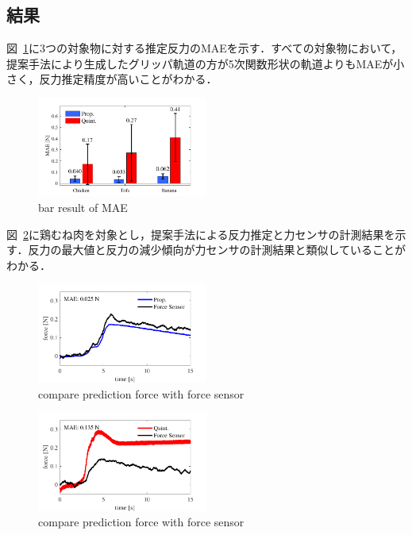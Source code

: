 \documentclass[a4paper]{jarticle}
\begin{document}
\subsection{結果}
図~\ref{fig:bar_result}に3つの対象物に対する推定反力のMAEを示す．すべての対象物において，提案手法により生成したグリッパ軌道の方が5次関数形状の軌道よりもMAEが小さく，反力推定精度が高いことがわかる．
\begin{figure}[htbp]
    \centering
    \includegraphics[width=0.5\textwidth]{bar_result.pdf}
    \caption{bar result of MAE}  
    \label{fig:bar_result}
\end{figure}
図~\ref{fig:pre_prop}に鶏むね肉を対象とし，提案手法による反力推定と力センサの計測結果を示す．反力の最大値と反力の減少傾向が力センサの計測結果と類似していることがわかる．
\begin{figure}[htbp]
    \centering
    \includegraphics[width=0.5\textwidth]{pre_prop.pdf}
    \caption{compare prediction force with force sensor}
    \label{fig:pre_prop}
\end{figure}
\begin{figure}[htbp]
    \centering
    \includegraphics[width=0.5\textwidth]{pre_quint.pdf}
    \caption{compare prediction force with force sensor}
    \label{fig:pre_quint}
\end{figure}
\end{document}
